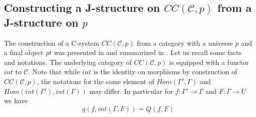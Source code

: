 \documentclass[12pt]{article}
\newenvironment{eq}{\begin{equation}}{\end{equation}}
\newcommand{\llabel}[1]{\label{#1}}
\newcommand{\sr}{\rightarrow}
\begin{document}
\subsection{Constructing a J-structure on $CC({\mathcal C},p)$ from a J-structure on $p$}
%
The construction of a C-system $CC({\mathcal C},p)$ from a category with a universe $p$ and a final object $pt$ was presented in \cite{Cfromauniverse} and summarized in \cite{fromunivwithPi}. Let us recall some facts and notations. The underlying category of $CC({\mathcal C},p)$ is equipped with a functor $int$ to $\mathcal C$. Note that while $int$ is the identity on morphisms by construction of $CC({\mathcal C},p)$, the notations for the same element of $Hom(\Gamma',\Gamma)$ and $Hom(int(\Gamma'),int(\Gamma))$ may differ. In particular for $f:\Gamma'\sr \Gamma$ and $F:\Gamma\sr U$ we have
%
\begin{eq}
\llabel{2015.04.02.eq2}
q(f,int(\Gamma,F))=Q(f,F)
\end{eq}
%
\end{document}
